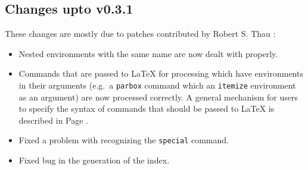 \subsection{Changes upto v0.3.1}
These changes are mostly due to patches contributed by Robert S. Thau
:
\begin{itemize}
\item Nested environments with the same name are now dealt with
properly.
\item Commands that are passed to LaTeX for processing which have 
environments in their arguments (e.g.\ a \texttt{parbox} command which 
an \texttt{itemize} environment as an argument) are now
processed correctly. A general mechanism for users to 
specify the syntax of commands that should be passed to LaTeX 
is described in Page \pageref{pass}.
\item Fixed a problem with recognizing the \texttt{special} command.
\item Fixed bug in the generation of the index.
\end{itemize}

